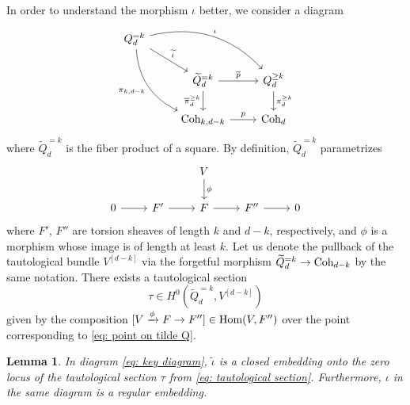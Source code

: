 \documentclass[10pt]{amsart}
\newcommand{\Coh}{\textnormal{Coh}}
\newcommand{\Hom}{\textnormal{Hom}}
\newcommand{\+}{{}^+}
\newtheorem {lemma}[theorem]{Lemma}
\theoremstyle{definition}
\theoremstyle {definition}
\theoremstyle {definition}
\begin{document}
In order to understand the morphism $\iota$ better, we consider a diagram 
\begin{equation}\label{eq: key diagram}
    \begin{tikzcd}
Q^{=k}_d \arrow[rd, "\widetilde\iota"] \arrow[rdd, bend right, "\pi_{k, d-k}"'] \arrow[rrd, bend left, "\iota"] &                                         &                        \\
                                                                   & \widetilde Q^{=k}_d \arrow[d, "\overline{\pi}_{d}^{\geq k}"'] \arrow[r, "\overline{p}"] & Q^{\geq k}_d \arrow[d, "\pi_{d}^{\geq k}"] \\
                                                                   & {\Coh_{k, d-k}} \arrow[r, "p"]               & \Coh_d                
\end{tikzcd}
\end{equation}
where $\widetilde Q^{=k}_d$ is the fiber product of a square. By definition, $\widetilde Q^{=k}_d$ parametrizes 
\begin{equation}\label{eq: point on tilde Q}
    \begin{tikzcd}
            &  &     V \arrow[d, "\phi"]        &               &   \\
0 \arrow[r] & F' \arrow[r]           & F \arrow[r] & F'' \arrow[r] & 0
\end{tikzcd}
\end{equation}
where $F'$, $F''$ are torsion sheaves of length $k$ and $d-k$, respectively, and $\phi$ is a morphism whose image is of length at least $k$. Let us denote the pullback of the tautological bundle $V^{[d-k]}$ via the forgetful morphism $\widetilde{Q}^{=k}_d\rightarrow \Coh_{d-k}$ by the same notation. There exists a tautological section 
\begin{equation}\label{eq: tautological section}
    \tau\in H^0(\widetilde Q^{=k}_d, V^{[d-k]})
\end{equation}
given by the composition $[V\xrightarrow{\phi}F\rightarrow F'']\in \Hom(V,F'')$ over the point corresponding to \eqref{eq: point on tilde Q}. 


\begin{lemma}\label{lem: tautological zero}
In diagram \eqref{eq: key diagram}, $\widetilde \iota$ is a closed embedding onto the zero locus of the tautological section $\tau$ from \eqref{eq: tautological section}. Furthermore, $\iota$ in the same diagram is a regular embedding. 

\end{lemma}
\end{document}
